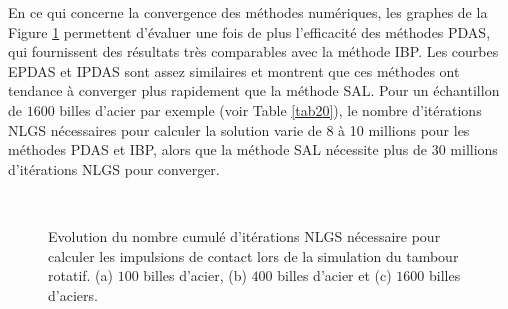En ce qui concerne la convergence des méthodes numériques, les graphes de la Figure \ref{cumul_nlgs_tambour} permettent d'évaluer une fois de plus l'efficacité des méthodes PDAS, qui fournissent des résultats très comparables avec la méthode IBP. Les courbes EPDAS et IPDAS sont assez similaires et montrent que ces méthodes ont tendance à converger plus rapidement que la méthode SAL. Pour un échantillon de $1600$ billes d'acier par exemple (voir Table \ref{tab20}), le nombre d'itérations NLGS nécessaires pour calculer la solution varie de 8 à 10 millions pour les méthodes PDAS et IBP, alors que la méthode SAL nécessite plus de 30 millions d'itérations NLGS pour converger.\\


\begin{figure}[h!]
\hspace{\fill}
\hspace{\fill}
   \\
\caption{\label{cumul_nlgs_tambour}Evolution du nombre cumulé d'itérations NLGS nécessaire pour calculer les impulsions de contact lors de la simulation du tambour rotatif. (a) $100$ billes d'acier, (b) $400$ billes d'acier et (c) $1600$ billes d'aciers.}
\end{figure}

